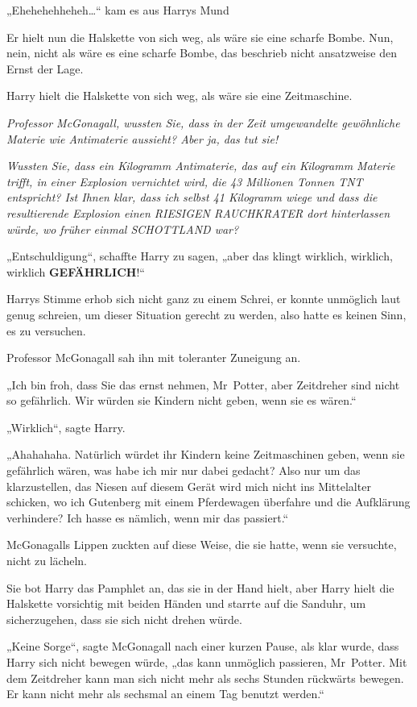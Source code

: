 {„Ehehehehheheh…“ kam es aus Harrys Mund

Er hielt nun die Halskette von sich weg, als wäre sie eine scharfe Bombe. Nun, nein, nicht als wäre es eine scharfe Bombe, das beschrieb nicht ansatzweise den Ernst der Lage.

Harry hielt die Halskette von sich weg, als wäre sie eine Zeitmaschine.

\emph{Professor McGonagall, wussten Sie, dass in der Zeit umgewandelte gewöhnliche Materie wie Antimaterie aussieht? Aber ja, das tut sie!}

\emph{Wussten Sie, dass ein Kilogramm Antimaterie, das auf ein Kilogramm Materie trifft, in einer Explosion vernichtet wird, die 43 Millionen Tonnen TNT entspricht? Ist Ihnen klar, dass ich selbst 41 Kilogramm wiege und dass die resultierende Explosion einen RIESIGEN RAUCHKRATER dort hinterlassen würde, wo früher einmal SCHOTTLAND war?}

„Entschuldigung“, schaffte Harry zu sagen, „aber das klingt wirklich, wirklich, wirklich \textbf{GEFÄHRLICH}!“

Harrys Stimme erhob sich nicht ganz zu einem Schrei, er konnte unmöglich laut genug schreien, um dieser Situation gerecht zu werden, also hatte es keinen Sinn, es zu versuchen.

Professor McGonagall sah ihn mit toleranter Zuneigung an.

„Ich bin froh, dass Sie das ernst nehmen, Mr~Potter, aber Zeitdreher sind nicht so gefährlich. Wir würden sie Kindern nicht geben, wenn sie es wären.“

„Wirklich“, sagte Harry.

„Ahahahaha. Natürlich würdet ihr Kindern keine Zeitmaschinen geben, wenn sie gefährlich wären, was habe ich mir nur dabei gedacht? Also nur um das klarzustellen, das Niesen auf diesem Gerät wird mich nicht ins Mittelalter schicken, wo ich Gutenberg mit einem Pferdewagen überfahre und die Aufklärung verhindere? Ich hasse es nämlich, wenn mir das passiert.“

McGonagalls Lippen zuckten auf diese Weise, die sie hatte, wenn sie versuchte, nicht zu lächeln.

Sie bot Harry das Pamphlet an, das sie in der Hand hielt, aber Harry hielt die Halskette vorsichtig mit beiden Händen und starrte auf die Sanduhr, um sicherzugehen, dass sie sich nicht drehen würde.

„Keine Sorge“, sagte McGonagall nach einer kurzen Pause, als klar wurde, dass Harry sich nicht bewegen würde, „das kann unmöglich passieren, Mr~Potter. Mit dem Zeitdreher kann man sich nicht mehr als sechs Stunden rückwärts bewegen. Er kann nicht mehr als sechsmal an einem Tag benutzt werden.“

}
